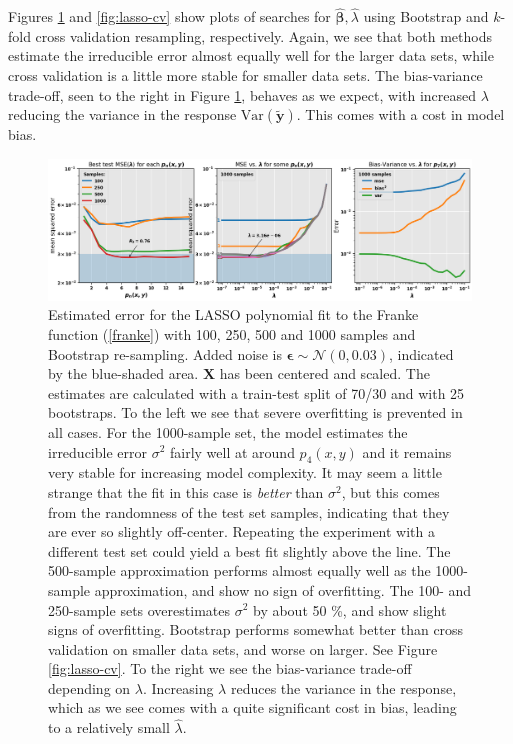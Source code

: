 \documentclass[]{article}
\begin{document}
Figures \ref{fig:lasso-bootstrap} and \ref{fig:lasso-cv} show plots of searches for $\mathbf{\hat{\beta}}, \hat{\lambda}$ using Bootstrap and $k$-fold cross validation resampling, respectively. Again, we see that both methods estimate the irreducible error almost equally well for the larger data sets, while cross validation is a little more stable for smaller data sets. The bias-variance trade-off, seen to the right in Figure \ref{fig:lasso-bootstrap}, behaves as we expect, with increased $\lambda$ reducing the variance in the response $\mathrm{Var}(\mathbf{\tilde{y}})$. This comes with a cost in model bias.

\begin{figure}[!htb]
	\centering
	\includegraphics[width=1\linewidth]{./results/lasso-bootstrap.png}
	\caption{Estimated error for the LASSO polynomial fit to the Franke function (\ref{franke}) with 100, 250, 500 and 1000 samples and Bootstrap re-sampling. Added noise is $\mathbf{\epsilon} \sim \mathcal{N}(0, 0.03)$, indicated by the blue-shaded area. $\mathbf{X}$ has been centered and scaled. The estimates are calculated with a train-test split of 70/30 and with 25 bootstraps. To the left we see that severe overfitting is prevented in all cases. For the 1000-sample set, the model estimates the irreducible error $\sigma^2$ fairly well at around $p_4(x,y)$ and it remains very stable for increasing model complexity. It may seem a little strange that the fit in this case is \textit{better} than $\sigma^2$, but this comes from the randomness of the test set samples, indicating that they are ever so slightly off-center. Repeating the experiment with a different test set could yield a best fit slightly above the line. The 500-sample approximation performs almost equally well as the 1000-sample approximation, and show no sign of overfitting. The 100- and 250-sample sets overestimates $\sigma^2$ by about 50 \%, and show slight signs of overfitting. Bootstrap performs somewhat better than cross validation on smaller data sets, and worse on larger. See Figure \ref{fig:lasso-cv}. To the right we see the bias-variance trade-off depending on $\lambda$. Increasing $\lambda$ reduces the variance in the response, which as we see comes with a quite significant cost in bias, leading to a relatively small $\hat{\lambda}$.}
	\label{fig:lasso-bootstrap}
\end{figure}
\end{document}
